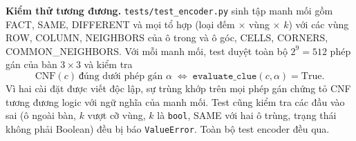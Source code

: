 \textbf{Kiểm thử tương đương.} \texttt{tests/test\_encoder.py} sinh tập manh
mối gồm FACT, SAME, DIFFERENT và mọi tổ hợp (loại đếm $\times$ vùng $\times$
$k$) với các vùng ROW, COLUMN, NEIGHBORS của ô trong và ô góc, CELLS, CORNERS,
COMMON\_NEIGHBORS. Với mỗi manh mối, test duyệt toàn bộ $2^9 = 512$ phép gán
của bàn $3\times3$ và kiểm tra
\[
\mathrm{CNF}(c)\ \text{đúng dưới phép gán } \alpha
\;\Longleftrightarrow\;
\texttt{evaluate\_clue}(c, \alpha) = \text{True}.
\]
Vì hai cài đặt được viết độc lập, sự trùng khớp trên mọi phép gán chứng tỏ CNF
tương đương logic với ngữ nghĩa của manh mối. Test cũng kiểm tra các đầu vào
sai (ô ngoài bàn, $k$ vượt cỡ vùng, $k$ là \texttt{bool}, SAME với hai ô trùng,
trạng thái không phải Boolean) đều bị báo \texttt{ValueError}. Toàn bộ test
encoder đều qua.
